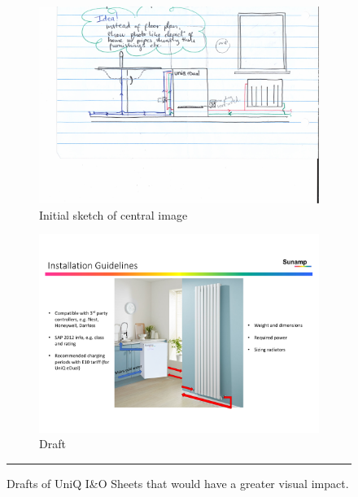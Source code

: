 \begin{figure}[htbp]
	\centering
	\begin{subfigure}{.48\textwidth}
		\centering
		\includegraphics[width=\textwidth]{figures/InstallationSketch.pdf}
		\caption{Initial sketch of central image}
		\label{fig:installation_sketch}
	\end{subfigure}
	\begin{subfigure}{.48\textwidth}
		\centering
		\includegraphics[width=\textwidth]{figures/InstallationGuidelines.pdf}
		\caption{Draft}
		\label{fig:installation_draft}
	\end{subfigure}
	\rule{\textwidth}{0.5pt} %
	\caption{Drafts of UniQ I\&O Sheets that would have a greater visual impact.}
	\label{fig:installation}
\end{figure}



